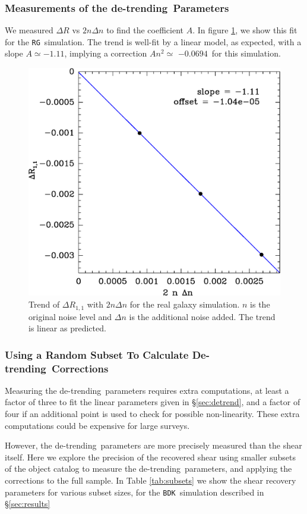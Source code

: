 \documentclass[iop]{emulateapj}
\newcommand{\detrend}{de-trending}
\newcommand{\Detrend}{De-trending}
\newcommand{\Aslope}{$-1.11$}
\newcommand{\Rcorr}{$-0.0694$}
\newcommand{\bdsim}{\texttt{BDK}}
\newcommand{\rgsim}{\texttt{RG}}
\begin{document}
\subsubsection{Measurements of the \detrend\ Parameters}

We measured $\Delta R$ vs $2 n \Delta n$ to find the
coefficient $A$.  In figure \ref{fig:detrend}, we show this fit for the \rgsim\
simulation.  The trend is well-fit by a linear model, as expected, with a slope
$A \simeq $\Aslope, implying a correction $A n^2 \simeq$ \Rcorr\ for this
simulation.

\begin{figure}
	\centering
    \includegraphics[width=0.5\columnwidth]{mcal-v14s01-Rnoise-detrend-R11.eps}

    \caption{Trend of $\Delta R_{1,1}$ with $2 n \Delta n$ for the
        real galaxy simulation.   $n$ is the
    original noise level and $\Delta n$ is the additional noise added.  The
    trend is linear as predicted.}

\label{fig:detrend}
\end{figure}




\subsubsection{Using a Random Subset To Calculate \Detrend\ Corrections}

Measuring the \detrend\ parameters requires extra computations, at least a
factor of three to fit the linear parameters given in \S \ref{sec:detrend}, and
a factor of four if an additional point is used to check for possible
non-linearity. These extra computations could be expensive for large surveys.  

However, the \detrend\ parameters are more precisely measured than the shear
itself.  Here we explore the precision of the recovered shear using smaller
subsets of the object catalog to measure the \detrend\ parameters, and
applying the corrections to the full sample.  In Table \ref{tab:subsets}
we show the shear recovery parameters for various subset sizes, for the
\bdsim\ simulation described in \S \ref{sec:results}
\end{document}
